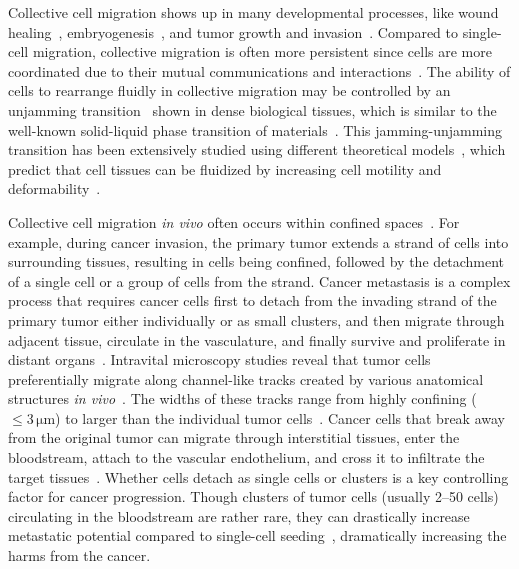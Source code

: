 Collective cell migration shows up in many developmental processes, like wound healing~\cite{poujade2007collective}, embryogenesis~\cite{chuai2012collective, weijer2009collective}, and tumor growth and invasion~\cite{haeger2014cell, cheung2016collective}.
Compared to single-cell migration, collective migration is often more persistent since cells are more coordinated due to their mutual communications and interactions~\cite{cheung2016collective, green2022pillarx}.
The ability of cells to rearrange fluidly in collective migration may be controlled by an unjamming transition~\cite{loewe2020solid, bi2016motility, zhang2020active, chiang2024multiphase} shown in dense biological tissues, which is similar to the well-known solid-liquid phase transition of materials~\cite{loewe2020solid}.
This jamming-unjamming transition has been extensively studied using different theoretical models~\cite{bi2016motility, loewe2020solid, zhang2020active, chiang2024multiphase, boromand2018jamming}, which predict that cell tissues can be fluidized by increasing cell motility and deformability~\cite{bi2016motility, loewe2020solid, chiang2024multiphase}.

Collective cell migration \textit{in vivo} often occurs within confined spaces~\cite{tarle2017modeling, balzer2012physical, lin2025gradients}.
For example, during cancer invasion, the primary tumor extends a strand of cells into surrounding tissues, resulting in cells being confined, followed by the detachment of a single cell or a group of cells from the strand.
Cancer metastasis is a complex process that requires cancer cells first to detach from the invading strand of the primary tumor either individually or as small clusters, and then migrate through adjacent tissue, circulate in the vasculature, and finally survive and proliferate in distant organs~\cite{cheung2016collective}.
Intravital microscopy studies reveal that tumor cells preferentially migrate along channel-like tracks created by various anatomical structures \textit{in vivo}~\cite{paul2017cancer}.
The widths of these tracks range from highly confining ($\leqslant 3\,\mathrm{\mu m}$) to larger than the individual tumor cells~\cite{weigelin2012intravital, wolf2009collagen}.
Cancer cells that break away from the original tumor can migrate through interstitial tissues, enter the bloodstream, attach to the vascular endothelium, and cross it to infiltrate the target tissues~\cite{dirusso2024beyond}.
Whether cells detach as single cells or clusters is a key controlling factor for cancer progression.
Though clusters of tumor cells (usually 2--50 cells) circulating in the bloodstream are rather rare, they can drastically increase metastatic potential compared to single-cell seeding~\cite{cheung2016collective, green2022pillarx}, dramatically increasing the harms from the cancer.

